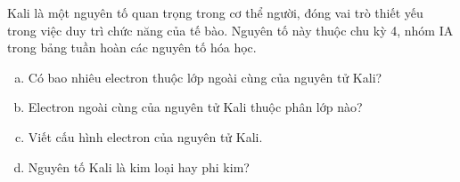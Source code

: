 \begin{bt}
	Kali là một nguyên tố quan trọng trong cơ thể người, đóng vai trò thiết yếu trong việc duy trì chức năng của tế bào. Nguyên tố này thuộc chu kỳ 4, nhóm IA trong bảng tuần hoàn các nguyên tố hóa học.
	\begin{enumerate}[a)]
		\item Có bao nhiêu electron thuộc lớp ngoài cùng của nguyên tử Kali?
		\item Electron ngoài cùng của nguyên tử Kali thuộc phân lớp nào?
		\item Viết cấu hình electron của nguyên tử Kali.
		\item Nguyên tố Kali là kim loại hay phi kim?
	\end{enumerate}
\end{bt}
